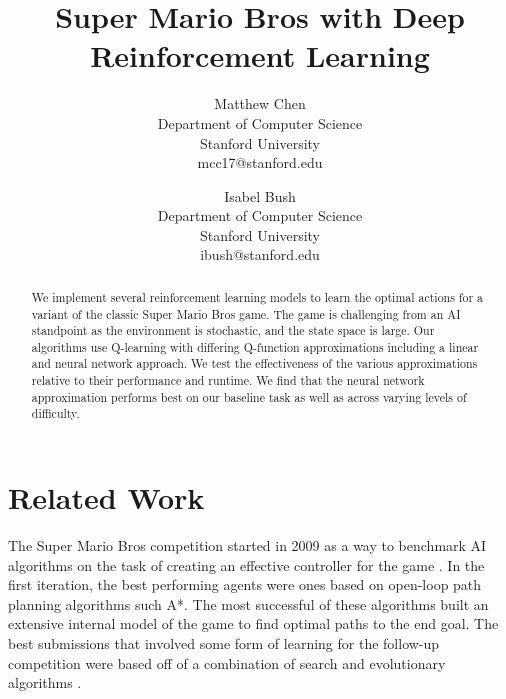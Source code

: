 \documentclass[12pt]{article}
\begin{document}
\nocite{*}

\title{Super Mario Bros with Deep Reinforcement Learning}

\author{
  Matthew Chen\\
  \small \vspace{-2mm} Department of Computer Science\\
  \small \vspace{-2mm} Stanford University\\
  \small mcc17@stanford.edu
  \and
  Isabel Bush\\
  \small \vspace{-2mm} Department of Computer Science\\
  \small \vspace{-2mm} Stanford University\\
  \small ibush@stanford.edu
}
\date{}
\maketitle

\begin{abstract}
We implement several reinforcement learning models to learn the optimal actions for a variant of the classic Super Mario Bros game. The game is challenging from an AI standpoint as the environment is stochastic, and the state space is large. Our algorithms use Q-learning with differing Q-function approximations including a linear and neural network approach. We test the effectiveness of the various approximations relative to their performance and runtime. We find that the neural network approximation performs best on our baseline task as well as across varying levels of difficulty.

\end{abstract}

\section{Related Work}

The Super Mario Bros competition started in 2009 as a way to benchmark AI algorithms on the task of creating an effective controller for the game \cite{togelius20102009}. In the first iteration, the best performing agents were ones based on open-loop path planning algorithms such A*. The most successful of these algorithms built an extensive internal model of the game to find optimal paths to the end goal. The best submissions that involved some form of learning for the follow-up competition were based off of a combination of search and evolutionary algorithms \cite{karakovskiy2012mario}.
\end{document}
